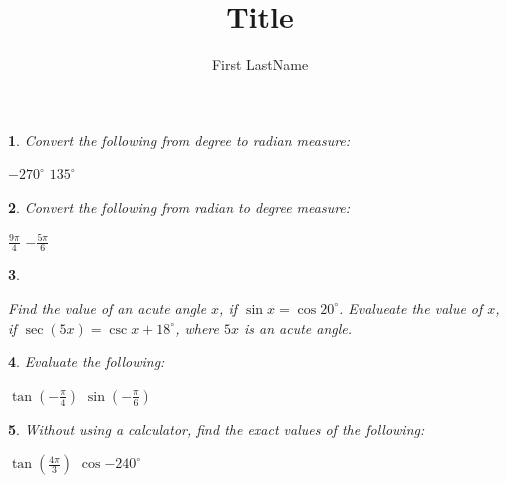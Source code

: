 \documentclass{article}
\title{Title}
\author{First LastName}
\theoremstyle{custom}
\newtheorem{question}{}
\begin{document}
\begin{question}
    Convert the following from degree to radian measure:
    \begin{tasks}
        \task $-270^{\circ}$
        \vspace{7 cm}
        \task $135^{\circ}$
        \vspace{7 cm}
    \end{tasks}
\end{question}

\begin{question}
    Convert the following from radian to degree measure:
    \begin{tasks}
        \task $\frac{9\pi}{4}$
        \vspace{7 cm}
        \task $-\frac{5\pi}{6}$
        \vspace{7 cm}
    \end{tasks}
\end{question}

\begin{question}
    \begin{tasks}
        \task Find the value of an acute angle $x$, if $\sin{x} = \cos{20^{\circ}}$.
        \vspace{7 cm}
        \task Evalueate the value of $x$, if $\sec(5x) = \csc{x + 18^{\circ}}$, where $5x$ is an acute angle.
        \vspace{7 cm}
    \end{tasks}
\end{question}

\begin{question}
    Evaluate the following:
    \begin{tasks}
        \task $\tan{(-\frac{\pi}{4})}$
        \vspace{7 cm}
        \task $\sin{(-\frac{\pi}{6})}$
        \vspace{7 cm}
    \end{tasks}
\end{question}

\begin{question}
    Without using a calculator, find the exact values of the following:
    \begin{tasks}
        \task $\tan{(\frac{4\pi}{3})}$
        \vspace{7 cm}
        \task $\cos{-240^{\circ}}$
        \vspace{7 cm}
    \end{tasks}
\end{question}
\end{document}
